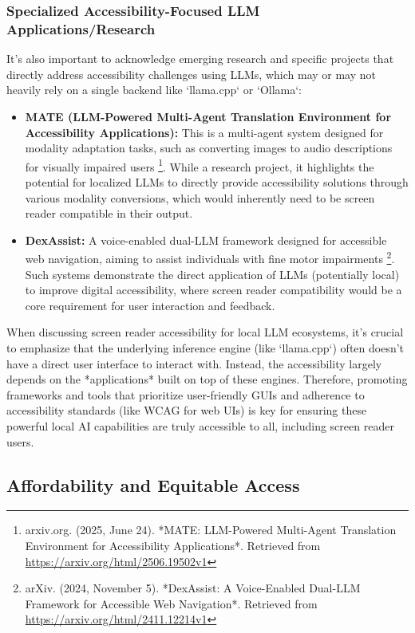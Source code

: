 \subsubsection{Specialized Accessibility-Focused LLM Applications/Research}
It's also important to acknowledge emerging research and specific projects that directly address accessibility challenges using LLMs, which may or may not heavily rely on a single backend like `llama.cpp` or `Ollama`:
\begin{itemize}
    \item \textbf{MATE (LLM-Powered Multi-Agent Translation Environment for Accessibility Applications):} This is a multi-agent system designed for modality adaptation tasks, such as converting images to audio descriptions for visually impaired users \footnote{arxiv.org. (2025, June 24). *MATE: LLM-Powered Multi-Agent Translation Environment for Accessibility Applications*. Retrieved from \url{https://arxiv.org/html/2506.19502v1}}. While a research project, it highlights the potential for localized LLMs to directly provide accessibility solutions through various modality conversions, which would inherently need to be screen reader compatible in their output.
    \item \textbf{DexAssist:} A voice-enabled dual-LLM framework designed for accessible web navigation, aiming to assist individuals with fine motor impairments \footnote{arXiv. (2024, November 5). *DexAssist: A Voice-Enabled Dual-LLM Framework for Accessible Web Navigation*. Retrieved from \url{https://arxiv.org/html/2411.12214v1}}. Such systems demonstrate the direct application of LLMs (potentially local) to improve digital accessibility, where screen reader compatibility would be a core requirement for user interaction and feedback.
\end{itemize}

When discussing screen reader accessibility for local LLM ecosystems, it's crucial to emphasize that the underlying inference engine (like `llama.cpp`) often doesn't have a direct user interface to interact with. Instead, the accessibility largely depends on the *applications* built on top of these engines. Therefore, promoting frameworks and tools that prioritize user-friendly GUIs and adherence to accessibility standards (like WCAG for web UIs) is key for ensuring these powerful local AI capabilities are truly accessible to all, including screen reader users.
\subsection{Affordability and Equitable Access}

